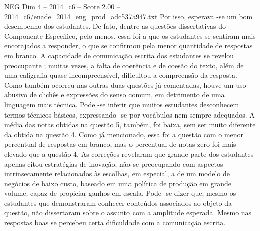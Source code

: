 \begin{textsample}{NEG Dim 4 – 2014\_c6 – Score 2.00 – 2014\_c6/enade\_2014\_eng\_prod\_adc537a947.txt}
Por isso, esperava -se um bom desempenho dos estudantes.
De fato, dentre as questões dissertativas do Componente Específico, pelo menos, essa foi a que os estudantes se sentiram mais encorajados a responder, o que se confirmou pela menor quantidade de respostas em branco.
A capacidade de comunicação escrita dos estudantes se revelou preocupante ; muitas vezes, a falta de coerência e de coesão do texto, além de uma caligrafia quase incompreensível, dificultou a compreensão da resposta.
Como também ocorreu nas outras duas questões já comentadas, houve um uso abusivo de clichês e expressões do senso comum, em detrimento de uma linguagem mais técnica.
Pode -se inferir que muitos estudantes desconhecem termos técnicos básicos, expressando -se por vocábulos nem sempre adequados.
A média das notas obtidas na questão 5, também, foi baixa, sem ser muito diferente da obtida na questão 4.
Como já mencionado, essa foi a questão com o menor percentual de respostas em branco, mas o percentual de notas zero foi mais elevado que a questão 4.
As correções revelaram que grande parte dos estudantes apenas citou estratégias de inovação, não se preocupando com aspectos intrinsecamente relacionados às escolhas, em especial, a de um modelo de negócios de baixo custo, baseado em uma política de produção em grande volume, capaz de propiciar ganhos em escala.
Pode -se dizer que, mesmo os estudantes que demonstraram conhecer conteúdos associados ao objeto da questão, não dissertaram sobre o assunto com a amplitude esperada.
Mesmo nas respostas boas se percebeu certa dificuldade com a comunicação escrita.

\end{textsample}
